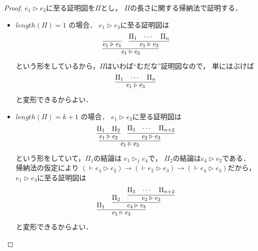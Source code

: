 \documentclass{ltjsbook}%
\begin{document}
\begin{proof}%
  $\mathit{e}_1\triangleright\mathit{e}_2$に至る証明図を$\Pi$とし，%
  $\Pi$の長さに関する帰納法で証明する．%
  \begin{itemize}%
  \item $length(\Pi)=1$ の場合．%
    $\mathit{e}_1\triangleright\mathit{e}_3$に至る証明図は%
    \begin{equation}%
      \infer{%
        \mathit{e}_1\triangleright\mathit{e}_3%
      }{%
        \infer{\mathit{e}_1\triangleright\mathit{e}_1}{}%
      &%
        \infer{\mathit{e}_1\triangleright\mathit{e}_3}{\Pi_1&\cdots&\Pi_n}%
      }%
    \end{equation}%
    という形をしているから，$\Pi$はいわば``むだな''証明図なので，%
    単にはぶけば%
    \begin{equation}%
      \infer{\mathit{e}_1\triangleright\mathit{e}_3}{\Pi_1&\cdots&\Pi_n}%
    \end{equation}%
    と変形できるからよい．%
  \item $length(\Pi)=k + 1$ の場合．%
    $\mathit{e}_1\triangleright\mathit{e}_3$に至る証明図は%
    \begin{equation}%
      \infer{%
        \mathit{e}_1\triangleright\mathit{e}_3%
      }{%
        \infer{%
          \mathit{e}_1\triangleright\mathit{e}_2%
        }{%
          \Pi_1%
        &%
          \Pi_2%
        }%
      &%
        \infer{%
          \mathit{e}_2\triangleright\mathit{e}_3%
        }{%
          \Pi_3&\cdots&\Pi_{n+2}%
        }%
      }%
    \end{equation}%
    という形をしていて，$\Pi_1$の結論は%
    $\mathit{e}_1\triangleright_1\mathit{e}_4$で，%
    $\Pi_2$の結論は$\mathit{e}_4\triangleright\mathit{e}_2$である．%
    帰納法の仮定により%
    $(\vdash\mathit{e}_4\triangleright\mathit{e}_2)\rightarrow%
    (\vdash\mathit{e}_2\triangleright\mathit{e}_3)\rightarrow%
    (\vdash\mathit{e}_4\triangleright\mathit{e}_3)$だから，%
    $\mathit{e}_1\triangleright\mathit{e}_3$に至る証明図は%
    \begin{equation}%
      \infer{%
        \mathit{e}_1\triangleright\mathit{e}_3%
      }{%
        \Pi_1%
      &%
        \infer{%
          \mathit{e}_4\triangleright\mathit{e}_3%
        }{%
          \Pi_2%
        &%
          \infer{%
            \mathit{e}_2\triangleright\mathit{e}_3%
          }{%
            \Pi_3&\cdots&\Pi_{n+2}%
          }%
        }%
      }%
    \end{equation}%
    と変形できるからよい．%
  \end{itemize}%
\end{proof}%
\end{document}
